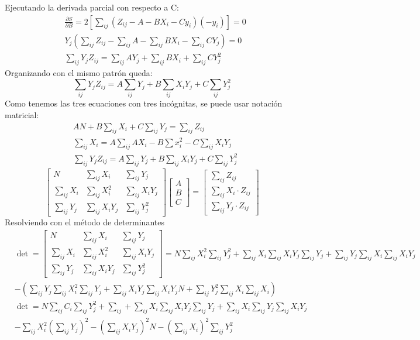 Ejecutando la derivada parcial con respecto a C:
\begin{align*}
    &\frac{\partial S}{\partial B} = 2\left[\sum_{ij}\left(Z_{ij} - A- BX_i - Cy_i \right)( - y_i)  \right] = 0\\
    &Y_j \left(\sum_{ij} Z_{ij} - \sum_{ij} A - \sum_{ij} BX_i - \sum_{ij} CY_j \right) = 0\\
    &\sum_{ij} Y_j Z_{ij} = \sum_{ij} AY_j + \sum_{ij} BX_i + \sum_{ij} CY_j^2
\end{align*}
Organizando con el mismo patrón queda:
\begin{equation*}
    \sum_{ij} Y_j Z_{ij} = A \sum_{ij} Y_j + B \sum_{ij}X_iY_j + C \sum_{ij} Y_j^2
\end{equation*}
Como tenemos las tres ecuaciones con tres incógnitas, se puede usar notación matricial:
\begin{align}
    &AN + B\sum_{ij} X_i + C \sum_{ij} Y_j = \sum_{ij} Z_{ij}\\
    &\sum_{ij} X_{i} = A\sum_{ij} AX_i - B\sum x^2_i - C\sum_{ij} X_i Y_j\\
    &\sum_{ij} Y_j Z_{ij} = A \sum_{ij} Y_j + B \sum_{ij}X_iY_j + C \sum_{ij} Y_j^2
\end{align}
\begin{equation}
    \begin{bmatrix}
        N&\sum_{ij}X_i& \sum_{ij}Y_j\\
        \sum_{ij}X_i&\sum_{ij}X_i^2&\sum_{ij}X_iY_j\\
        \sum_{ij}Y_j&\sum_{ij}X_iY_j&\sum_{ij}Y_j^2
    \end{bmatrix}\begin{bmatrix}
        A\\
        B\\
        C
    \end{bmatrix} =\begin{bmatrix}
        \sum_{ij}Z_{ij}\\
        \sum_{ij}X_i\cdot Z_{ij}\\
        \sum_{ij}Y_j\cdot Z_{ij}
    \end{bmatrix}
\end{equation}
Resolviendo con el método de determinantes
\begin{align*}
    &\det = \begin{bmatrix}
        N&\sum_{ij}X_i& \sum_{ij}Y_j\\
        \sum_{ij}X_i&\sum_{ij}X_i^2&\sum_{ij}X_iY_j\\
        \sum_{ij}Y_j&\sum_{ij}X_iY_j&\sum_{ij}Y_j^2
    \end{bmatrix} = N\sum_{ij} X_i^2 \sum_{ij} Y_j^2 + \sum_{ij}X_i \sum_{ij} X_iY_j \sum_{ij} Y_j + \sum_{ij} Y_j \sum_{ij}X_i \sum_{ij}X_iY_j\\
    &-\left(\sum_{ij} Y_j\sum_{ij}X_i^2\sum_{ij} Y_j + \sum_{ij}X_iY_j\sum_{ij}X_iY_jN + \sum_{ij} Y_j^2\sum_{ij} X_i\sum_{ij}X_i   \right)\\
    &\det = N \sum_{ij} C_i \sum_{ij} Y_j^2 +\sum_{ij} + \sum_{ij} X_i \sum_{ij}X_iY_j \sum_{ij}Y_j + \sum_{ij}X_i \sum_{ij}Y_j \sum_{ij}X_iY_j\\
    &-\sum_{ij} X_i^2\left(\sum_{ij} Y_j\right)^2 - \left(\sum_{ij} X_iY_j\right)^2N -\left(\sum_{ij} X_i\right)^2 \sum_{ij} Y_j^2 
\end{align*}
